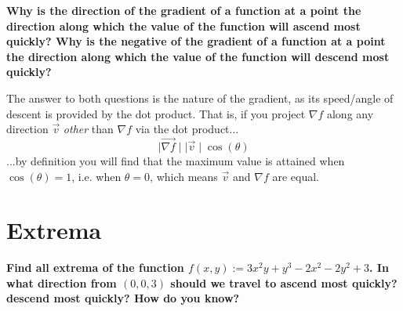 \documentclass{article}
\begin{document}
\textbf{Why is the direction of the gradient of a function at a point the direction along
which the value of the function will ascend most quickly? Why is the negative
of the gradient of a function at a point the direction along which the value of
the function will descend most quickly?}\newline

The answer to both questions is the nature of the gradient, as its speed/angle of descent is provided by the dot product. That is, if you project $\nabla f$ along any direction $\vec{v}$ \textit{other} than $\nabla f$ via the dot product...
\[\mid\vec{\nabla f}\mid\mid\vec{v}\mid\cos(\theta)\]
...by definition you will find that the maximum value is attained when $\cos(\theta)=1$, i.e. when $\theta=0$, which means $\vec{v}$ and $\nabla f$ are equal.
    

\section{Extrema}
\textbf{Find all extrema of the function $f(x,y) := 3x^{2}y+y^{3}-2x^{2}-2y^{2}+3$. In what direction from $(0,0,3)$ should we travel to ascend most quickly? descend most quickly? How do you know?}
\end{document}
